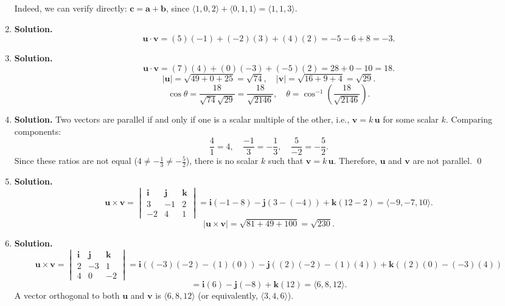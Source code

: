 \begin{enumerate}
Indeed, we can verify directly: \( \mathbf{c} = \mathbf{a} + \mathbf{b} \), since \( \langle 1, 0, 2 \rangle + \langle 0, 1, 1 \rangle = \langle 1, 1, 3 \rangle \).

\item \textbf{Solution.}
\[
\mathbf{u} \cdot \mathbf{v} = (5)(-1) + (-2)(3) + (4)(2) = -5 - 6 + 8 = -3.
\]

\item \textbf{Solution.}
\[
\mathbf{u} \cdot \mathbf{v} = (7)(4) + (0)(-3) + (-5)(2) = 28 + 0 - 10 = 18.
\]
\[
|\mathbf{u}| = \sqrt{49 + 0 + 25} = \sqrt{74}, \quad |\mathbf{v}| = \sqrt{16 + 9 + 4} = \sqrt{29}.
\]
\[
\cos\theta = \frac{18}{\sqrt{74}\sqrt{29}} = \frac{18}{\sqrt{2146}}, \quad \theta = \cos^{-1}\!\left(\frac{18}{\sqrt{2146}}\right).
\]

\item \textbf{Solution.}
Two vectors are parallel if and only if one is a scalar multiple of the other, i.e., \( \mathbf{v} = k\,\mathbf{u} \) for some scalar \( k \). Comparing components:
\[
\frac{4}{1} = 4, \quad \frac{-1}{3} = -\frac{1}{3}, \quad \frac{5}{-2} = -\frac{5}{2}.
\]
Since these ratios are not equal (\( 4 \neq -\frac{1}{3} \neq -\frac{5}{2} \)), there is no scalar \( k \) such that \( \mathbf{v} = k\,\mathbf{u} \). Therefore, \( \mathbf{u} \) and \( \mathbf{v} \) are not parallel. \qed

\item \textbf{Solution.}
\[
\mathbf{u} \times \mathbf{v} = \begin{vmatrix} \mathbf{i} & \mathbf{j} & \mathbf{k} \\ 3 & -1 & 2 \\ -2 & 4 & 1 \end{vmatrix} = \mathbf{i}(-1 - 8) - \mathbf{j}(3 - (-4)) + \mathbf{k}(12 - 2) = \langle -9, -7, 10 \rangle.
\]
\[
|\mathbf{u} \times \mathbf{v}| = \sqrt{81 + 49 + 100} = \sqrt{230}.
\]

\item \textbf{Solution.}
\[
\mathbf{u} \times \mathbf{v} = \begin{vmatrix} \mathbf{i} & \mathbf{j} & \mathbf{k} \\ 2 & -3 & 1 \\ 4 & 0 & -2 \end{vmatrix} = \mathbf{i}((-3)(-2) - (1)(0)) - \mathbf{j}((2)(-2) - (1)(4)) + \mathbf{k}((2)(0) - (-3)(4))
\]
\[
= \mathbf{i}(6) - \mathbf{j}(-8) + \mathbf{k}(12) = \langle 6, 8, 12 \rangle.
\]
A vector orthogonal to both \( \mathbf{u} \) and \( \mathbf{v} \) is \( \langle 6, 8, 12 \rangle \) (or equivalently, \( \langle 3, 4, 6 \rangle \)).


\end{enumerate}
